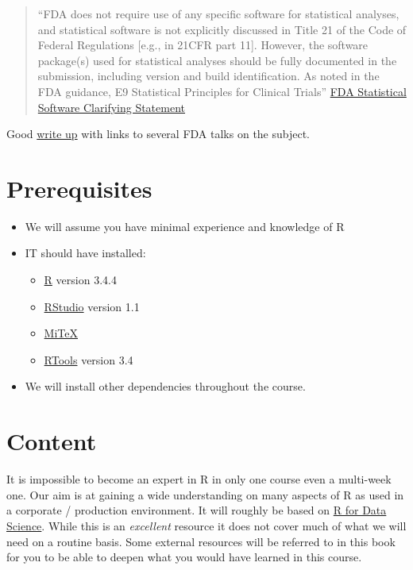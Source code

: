 \documentclass[]{book}
\providecommand{\tightlist}{%
  \setlength{\itemsep}{0pt}\setlength{\parskip}{0pt}}
\theoremstyle{definition}
\theoremstyle{definition}
\theoremstyle{definition}
\theoremstyle{remark}
\begin{document}
\begin{quote}
``FDA does not require use of any specific software for statistical
analyses, and statistical software is not explicitly discussed in Title
21 of the Code of Federal Regulations {[}e.g., in 21CFR part 11{]}.
However, the software package(s) used for statistical analyses should be
fully documented in the submission, including version and build
identification. As noted in the FDA guidance, E9 Statistical Principles
for Clinical Trials''
\href{https://www.fda.gov/downloads/forindustry/datastandards/studydatastandards/ucm587506.pdf}{FDA
Statistical Software Clarifying Statement}
\end{quote}

Good \href{http://blog.revolutionanalytics.com/2017/06/r-fda.html}{write
up} with links to several FDA talks on the subject.

\hypertarget{prerequisites}{%
\section{Prerequisites}\label{prerequisites}}

\begin{itemize}
\tightlist
\item
  We will assume you have minimal experience and knowledge of R
\item
  IT should have installed:

  \begin{itemize}
  \tightlist
  \item
    \href{https://cran.r-project.org/}{R} version 3.4.4
  \item
    \href{https://www.rstudio.com/products/rstudio/download/\#download}{RStudio}
    version 1.1
  \item
    \href{https://miktex.org/}{MiTeX}
  \item
    \href{https://cran.r-project.org/bin/windows/Rtools/}{RTools}
    version 3.4
  \end{itemize}
\item
  We will install other dependencies throughout the course.
\end{itemize}

\hypertarget{content}{%
\section{Content}\label{content}}

It is impossible to become an expert in R in only one course even a
multi-week one. Our aim is at gaining a wide understanding on many
aspects of R as used in a corporate / production environment. It will
roughly be based on \href{http://r4ds.had.co.nz}{R for Data Science}.
While this is an \emph{excellent} resource it does not cover much of
what we will need on a routine basis. Some external resources will be
referred to in this book for you to be able to deepen what you would
have learned in this course.
\end{document}
